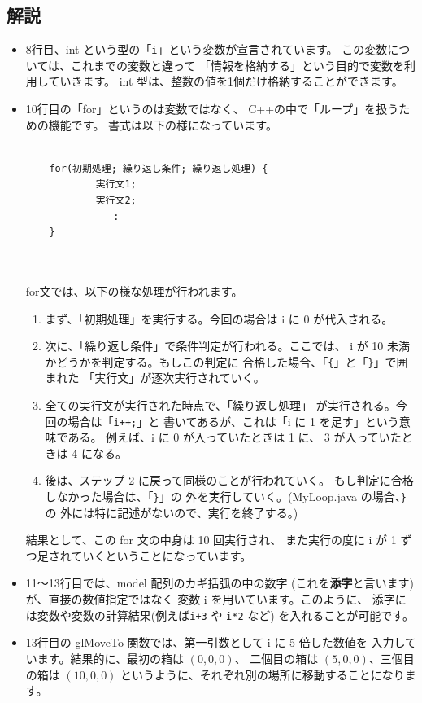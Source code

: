 \subsection*{解説}
\begin{itemize}
 \item 8行目、int という型の「\verb+i+」という変数が宣言されています。
	この変数については、これまでの変数と違って
	「情報を格納する」という目的で変数を利用していきます。
	int 型は、整数の値を1個だけ格納することができます。

 \item 10行目の「for」というのは変数ではなく、
	C++の中で「ループ」を扱うための機能です。
	書式は以下の様になっています。\\ ~ \\
	\begin{shadebox}
	\begin{verbatim}
	for(初期処理; 繰り返し条件; 繰り返し処理) {
	        実行文1;
	        実行文2;
	           :
	}
	\end{verbatim}
	\end{shadebox} \\ ~ \\
	for文では、以下の様な処理が行われます。
	\begin{enumerate}
	\item まず、「初期処理」を実行する。今回の場合は
		i に 0 が代入される。
	\item 次に、「繰り返し条件」で条件判定が行われる。ここでは、
		i が 10 未満かどうかを判定する。もしこの判定に
		合格した場合、「\verb+{+」と「\verb+}+」で囲まれた
		「実行文」が逐次実行されていく。
	\item 全ての実行文が実行された時点で、「繰り返し処理」
		が実行される。今回の場合は「\verb-i++;-」と
		書いてあるが、これは「i に 1 を足す」という意味である。
		例えば、i に 0 が入っていたときは 1 に、
		3 が入っていたときは 4 になる。
	\item 後は、ステップ 2 に戻って同様のことが行われていく。
		もし判定に合格しなかった場合は、「\verb+}+」の
		外を実行していく。(MyLoop.java の場合、\verb+}+ の
		外には特に記述がないので、実行を終了する。)
	\end{enumerate}
	結果として、この for 文の中身は 10 回実行され、
	また実行の度に i が 1 ずつ足されていくということになっています。

 \item 11〜13行目では、model 配列のカギ括弧の中の数字
	(これを\textbf{添字}と言います)が、直接の数値指定ではなく
	変数 i を用いています。このように、
	添字には変数や変数の計算結果(例えば\verb-i+3- や \verb+i*2+ など)
	を入れることが可能です。

 \item 13行目の glMoveTo 関数では、第一引数として i に 5 倍した数値を
	入力しています。結果的に、最初の箱は \((0, 0, 0)\)、
	二個目の箱は \((5, 0, 0)\)、三個目の箱は \((10, 0, 0)\)
	というように、それぞれ別の場所に移動することになります。

\end{itemize}
\newpage

